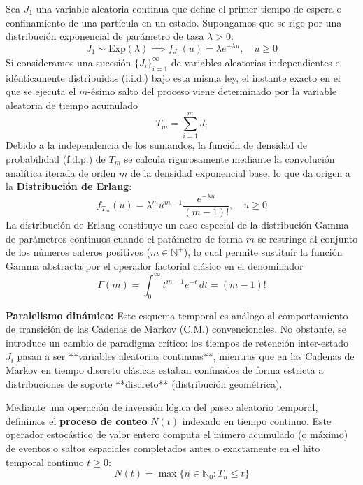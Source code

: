 \begin{ejemplo}  
    Sea $J_1$ una variable aleatoria continua que define el primer tiempo de espera o confinamiento de una partícula en un estado. Supongamos que se rige por una distribución exponencial de parámetro de tasa $\lambda > 0$:
    \[
    J_1 \sim \text{Exp}(\lambda) \implies f_{J_1}(u) = \lambda e^{-\lambda u}, \quad u \ge 0
    \]
    Si consideramos una sucesión $\{J_i\}_{i=1}^{\infty}$ de variables aleatorias independientes e idénticamente distribuidas (i.i.d.) bajo esta misma ley, el instante exacto en el que se ejecuta el $m$-ésimo salto del proceso viene determinado por la variable aleatoria de tiempo acumulado 
    $$T_m = \sum_{i=1}^{m} J_i$$
    Debido a la independencia de los sumandos, la función de densidad de probabilidad (f.d.p.) de $T_m$ se calcula rigurosamente mediante la convolución analítica iterada de orden $m$ de la densidad exponencial base, lo que da origen a la \textbf{Distribución de Erlang}:
    \[
    f_{T_m}(u) = \lambda^m u^{m-1} \frac{e^{-\lambda u}}{(m-1)!}, \quad u \ge 0
    \]
    La distribución de Erlang constituye un caso especial de la distribución Gamma de parámetros continuos cuando el parámetro de forma $m$ se restringe al conjunto de los números enteros positivos ($m \in \mathbb{N}^+$), lo cual permite sustituir la función Gamma abstracta por el operador factorial clásico en el denominador
    \[
    \Gamma(m) = \int_{0}^{\infty} t^{m-1} e^{-t} \, dt = (m-1)!
    \]

    \noindent \textbf{Paralelismo dinámico:} Este esquema temporal es análogo al comportamiento de transición de las Cadenas de Markov (C.M.) convencionales. No obstante, se introduce un cambio de paradigma crítico: los tiempos de retención inter-estado $J_i$ pasan a ser **variables aleatorias continuas**, mientras que en las Cadenas de Markov en tiempo discreto clásicas estaban confinados de forma estricta a distribuciones de soporte **discreto** (distribución geométrica). \\
\end{ejemplo}

 
\begin{definicion}
    Mediante una operación de inversión lógica del paseo aleatorio temporal, definimos el \textbf{proceso de conteo} $N(t)$ indexado en tiempo continuo. Este operador estocástico de valor entero computa el número acumulado (o máximo) de eventos o saltos espaciales completados antes o exactamente en el hito temporal continuo $t \ge 0$:
    \[
    N(t) = \max \{ n \in \mathbb{N}_0 : T_n \le t \}
    \]
\end{definicion}

